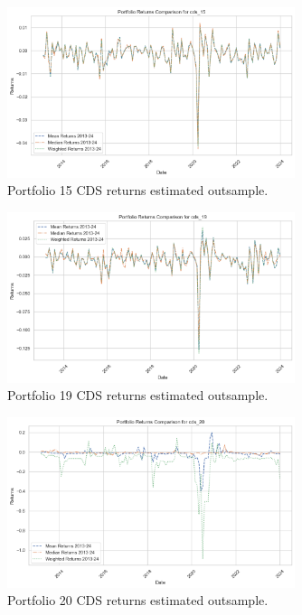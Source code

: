 \documentclass{article}
\begin{document}
\begin{Data science tools for finance final project}
\begin{figure}[H]
    \centering
    \includegraphics[width=0.75\textwidth]{../assets/returns_cds15_2013_2024.png}
    \caption{\label{fig:myplot}Portfolio 15 CDS returns estimated outsample.}
    \end{figure}          

\begin{figure}[H]
    \centering
    \includegraphics[width=0.75\textwidth]{../assets/returns_cds19_2013_2024.png}
    \caption{\label{fig:myplot}Portfolio 19 CDS returns estimated outsample.}
    \end{figure}   

\begin{figure}[H]
    \centering
    \includegraphics[width=0.75\textwidth]{../assets/returns_cds20_2013_2024.png}
    \caption{\label{fig:myplot}Portfolio 20 CDS returns estimated outsample.}
    \end{figure}   
    



\end{Data science tools for finance final project}
\end{document}
